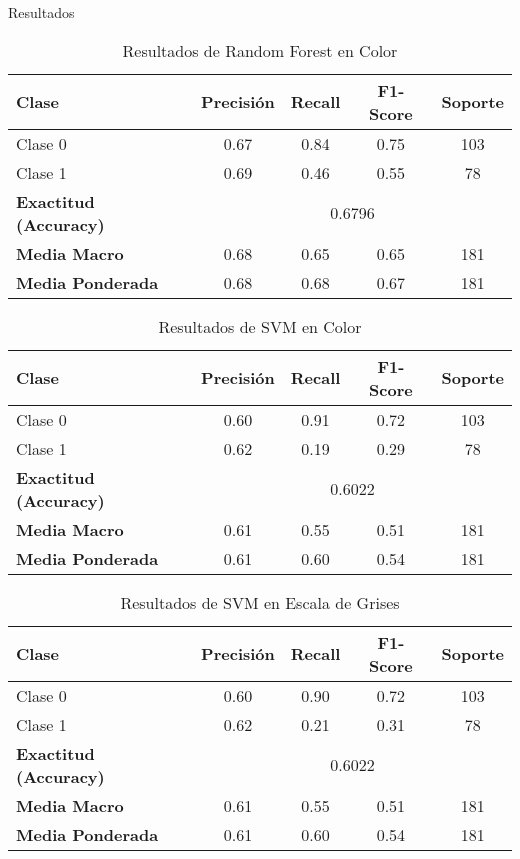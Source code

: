 \documentclass[11pt]{article}
\begin{document}
\begin{section}{Resultados}
\begin{table}[H]
\caption{Resultados de Random Forest en Color}
\begin{tabular}{|l|c|c|c|c|}
\hline
\textbf{Clase} & \textbf{Precisión} & \textbf{Recall} & \textbf{F1-Score} & \textbf{Soporte} \\
\hline
Clase 0 & 0.67 & 0.84 & 0.75 & 103 \\
Clase 1 & 0.69 & 0.46 & 0.55 & 78 \\
\hline
\textbf{Exactitud (Accuracy)} & \multicolumn{4}{c|}{0.6796} \\
\textbf{Media Macro} & 0.68 & 0.65 & 0.65 & 181 \\
\textbf{Media Ponderada} & 0.68 & 0.68 & 0.67 & 181 \\
\hline
\end{tabular}
\end{table}
\begin{table}[htbp]
\centering
\caption{Resultados de SVM en Color}
\begin{tabular}{|l|c|c|c|c|}
\hline
\textbf{Clase} & \textbf{Precisión} & \textbf{Recall} & \textbf{F1-Score} & \textbf{Soporte} \\
\hline
Clase 0 & 0.60 & 0.91 & 0.72 & 103 \\
Clase 1 & 0.62 & 0.19 & 0.29 & 78 \\
\hline
\textbf{Exactitud (Accuracy)} & \multicolumn{4}{c|}{0.6022} \\
\textbf{Media Macro} & 0.61 & 0.55 & 0.51 & 181 \\
\textbf{Media Ponderada} & 0.61 & 0.60 & 0.54 & 181 \\
\hline
\end{tabular}
\end{table}
\begin{table}[htbp]
\centering
\caption{Resultados de SVM en Escala de Grises}
\begin{tabular}{|l|c|c|c|c|}
\hline
\textbf{Clase} & \textbf{Precisión} & \textbf{Recall} & \textbf{F1-Score} & \textbf{Soporte} \\
\hline
Clase 0 & 0.60 & 0.90 & 0.72 & 103 \\
Clase 1 & 0.62 & 0.21 & 0.31 & 78 \\
\hline
\textbf{Exactitud (Accuracy)} & \multicolumn{4}{c|}{0.6022} \\
\textbf{Media Macro} & 0.61 & 0.55 & 0.51 & 181 \\
\textbf{Media Ponderada} & 0.61 & 0.60 & 0.54 & 181 \\
\hline
\end{tabular}
\end{table}

\end{section}
\end{document}
